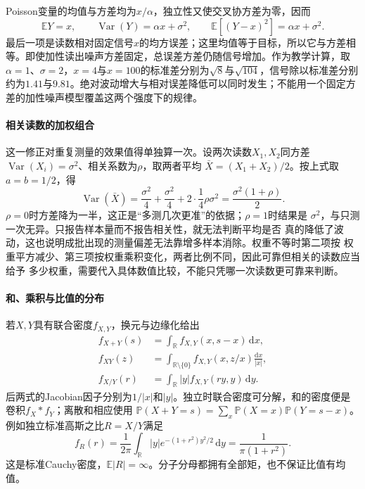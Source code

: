 Poisson变量的均值与方差均为\(x/\alpha\)，独立性又使交叉协方差为零，因而
\begin{equation}
 \mathbb E Y=x,\qquad
 \operatorname{Var}(Y)=\alpha x+\sigma^2,
 \qquad
 \mathbb E[(Y-x)^2]=\alpha x+\sigma^2.
 \label{eq:probability-poisson-gaussian-moments}
\end{equation}
最后一项是读数相对固定信号\(x\)的均方误差；这里均值等于目标，所以它与方差相等。即使加性读出噪声方差固定，总误差方差仍随信号增加。作为教学计算，取\(\alpha=1\)、\(\sigma=2\)，\(x=4\)与\(x=100\)的标准差分别为\(\sqrt8\)与\(\sqrt{104}\)，信号除以标准差分别约为\(1.41\)与\(9.81\)。绝对波动增大与相对误差降低可以同时发生；不能用一个固定方差的加性噪声模型覆盖这两个强度下的规律。


\paragraph{相关读数的加权组合}
这一修正对重复测量的效果值得单独算一次。设两次读数\(X_1,X_2\)同方差
\(\operatorname{Var}(X_i)=\sigma^2\)、相关系数为\(\rho\)，取两者平均
\(\bar X=(X_1+X_2)/2\)。按上式取\(a=b=1/2\)，得
\[
  \operatorname{Var}(\bar X)
  =\frac{\sigma^2}{4}+\frac{\sigma^2}{4}
   +2\cdot\frac14\rho\sigma^2
  =\frac{\sigma^2(1+\rho)}2.
\]
\(\rho=0\)时方差降为一半，这正是“多测几次更准”的依据；\(\rho=1\)时结果是
\(\sigma^2\)，与只测一次无异。只报告样本量而不报告相关性，就无法判断平均是否
真的降低了波动，这也说明成批出现的测量偏差无法靠增多样本消除。权重不等时第二项按
权重平方减少、第三项按权重乘积变化，两者比例不同，因此可靠但相关的读数应当给予
多少权重，需要代入具体数值比较，不能只凭哪一次读数更可靠来判断。

\paragraph{和、乘积与比值的分布}
若\(X,Y\)具有联合密度\(f_{X,Y}\)，换元与边缘化给出
\[
\begin{aligned}
f_{X+Y}(s)&=\int_{\mathbb R}f_{X,Y}(x,s-x)\,\mathrm dx,\\
f_{XY}(z)&=\int_{\mathbb R\setminus\{0\}}
 f_{X,Y}(x,z/x)\frac{\mathrm dx}{|x|},\\
f_{X/Y}(r)&=\int_{\mathbb R}|y|f_{X,Y}(ry,y)\,\mathrm dy.
\end{aligned}
\]
后两式的Jacobian因子分别为\(1/|x|\)和\(|y|\)。独立时联合密度可分解，和的密度便是卷积\(f_X*f_Y\)；离散和相应使用
\(\mathbb P(X+Y=s)=\sum_x\mathbb P(X=x)\mathbb P(Y=s-x)\)。
例如独立标准高斯之比\(R=X/Y\)满足
\[
f_R(r)=\frac1{2\pi}\int_{\mathbb R}|y|
 e^{-(1+r^2)y^2/2}\,\mathrm dy
=\frac1{\pi(1+r^2)}.
\]
这是标准Cauchy密度，\(\mathbb E|R|=\infty\)。分子分母都拥有全部矩，也不保证比值有均值。

